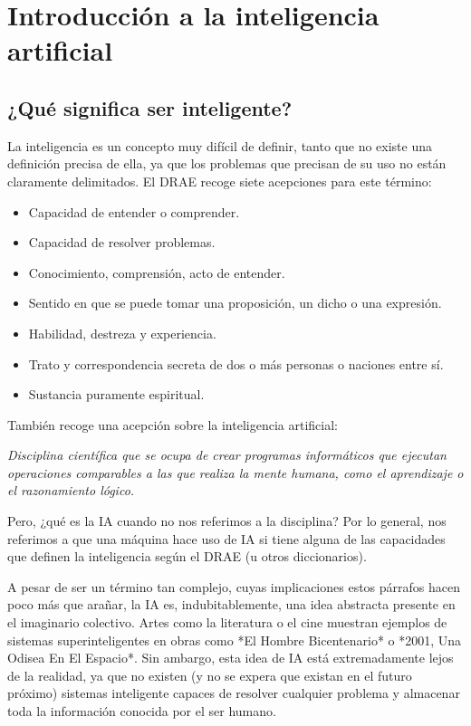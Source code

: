 \chapter{Introducción a la inteligencia artificial}

\section{¿Qué significa ser inteligente?}

La inteligencia es un concepto muy difícil de definir, tanto que no existe una definición precisa de ella, ya que los problemas que precisan de su uso no están claramente delimitados.
El DRAE recoge siete acepciones para este término:

\begin{itemize}
	\item Capacidad de entender o comprender.
	\item Capacidad de resolver problemas.
	\item Conocimiento, comprensión, acto de entender.
	\item Sentido en que se puede tomar una proposición, un dicho o una expresión.
	\item Habilidad, destreza y experiencia.
	\item Trato y correspondencia secreta de dos o más personas o naciones entre sí.
	\item Sustancia puramente espiritual.
\end{itemize}

También recoge una acepción sobre la inteligencia artificial:

\begin{displayquote}
\textit{Disciplina científica que se ocupa de crear programas informáticos que ejecutan operaciones comparables a las que realiza la mente humana, como el aprendizaje o el razonamiento lógico.}
\end{displayquote}

Pero, ¿qué es la IA cuando no nos referimos a la disciplina?
Por lo general, nos referimos a que una máquina hace uso de IA si tiene alguna de las capacidades que definen la inteligencia según el DRAE (u otros diccionarios).

A pesar de ser un término tan complejo, cuyas implicaciones estos párrafos hacen poco más que arañar, la IA es, indubitablemente, una idea abstracta presente en el imaginario colectivo.
Artes como la literatura o el cine muestran ejemplos de sistemas superinteligentes en obras como *El Hombre Bicentenario* o *2001, Una Odisea En El Espacio*.
Sin ambargo, esta idea de IA está extremadamente lejos de la realidad, ya que no existen (y no se expera que existan en el futuro próximo) sistemas inteligente capaces de resolver cualquier problema y almacenar toda la información conocida por el ser humano.

